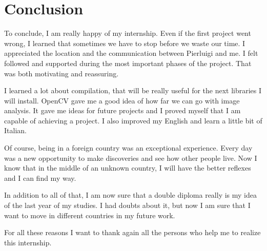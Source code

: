 \chapter{Conclusion}

\par To conclude, I am really happy of my internship. Even if the first project went wrong, I learned that sometimes we have to stop before we waste our time. I appreciated the location and the communication between Pierluigi and me. I felt followed and supported during the most important phases of the project. That was both motivating and reassuring.
\par I learned a lot about compilation, that will be really useful for the next libraries I will install. OpenCV gave me a good idea of how far we can go with image analysis. It gave me ideas for future projects and I proved myself that I am capable of achieving a project. I also improved my English and learn a little bit of Italian. 
\par Of course, being in a foreign country was an exceptional experience. Every day was a new opportunity to make discoveries and see how other people live. Now I know that in the middle of an unknown country, I will have the better reflexes and I can find my way.
\par In addition to all of that, I am now sure that a double diploma really is my idea of the last year of my studies. I had doubts about it, but now I am sure that I want to move in different countries in my future work.
\par For all these reasons I want to thank again all the persons who help me to realize this internship.